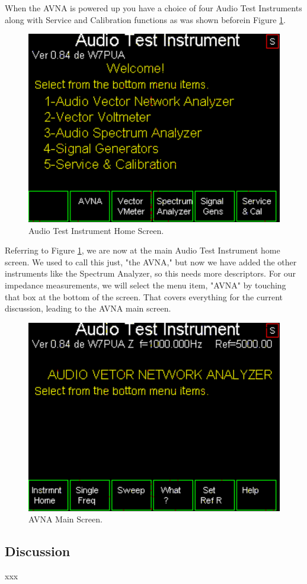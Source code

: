 When the AVNA is powered up you have a choice of four Audio Test Instruments along with Service and Calibration functions as was shown beforein Figure \ref{AVNA_000-label}.
\begin{figure}[H]
\begin{center}
\includegraphics[scale=0.75]{./images/AVNA_000.pdf}
\caption{Audio Test Instrument Home  Screen.}
\label{AVNA_000-label}
\end{center}
\end{figure}
%
Referring to Figure \ref{AVNA_000-label}, we are now at the main Audio Test Instrument home screen.
We used to call this just, "the AVNA," but now we have added the other instruments like the Spectrum Analyzer, so this needs more descriptors.
For our impedance measurements, we will select the menu item, "AVNA" by touching that box at the bottom of the screen.
That  covers everything for the current discussion, leading to the AVNA main screen.
\begin{figure}[H]
\begin{center}
\includegraphics[scale=0.75]{./images/AVNA_001.pdf}
\caption{AVNA Main  Screen.}
\label{AVNA_001-label}
\end{center}
\end{figure}
%
\subsection{Discussion}
xxx
